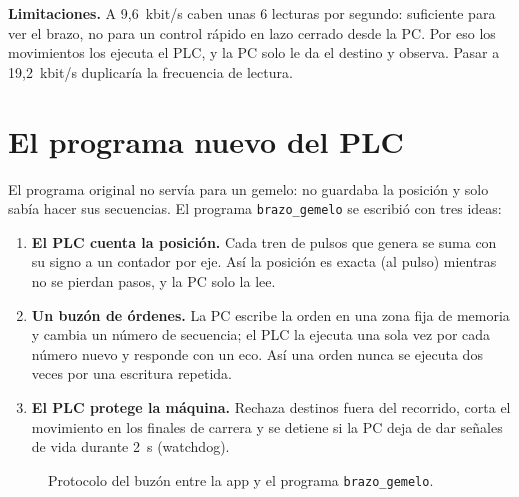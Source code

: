 \documentclass[a4paper,11pt]{article}
\newcommand{\codigo}[1]{\texttt{#1}}
\newcommand{\limite}[1]{\par\smallskip\noindent\colorbox{rojo!8}{\parbox{\dimexpr\linewidth-2\fboxsep}{\textbf{\color{rojo}Limitaciones.} #1}}\par\smallskip}
\begin{document}
\limite{A 9,6~kbit/s caben unas 6 lecturas por segundo: suficiente para ver el brazo, no para un control rápido en lazo cerrado desde la PC. Por eso los movimientos los ejecuta el PLC, y la PC solo le da el destino y observa. Pasar a 19,2~kbit/s duplicaría la frecuencia de lectura.}

\section{El programa nuevo del PLC}\label{sec:programa}

El programa original no servía para un gemelo: no guardaba la posición y solo sabía hacer sus secuencias. El programa \codigo{brazo\_gemelo} se escribió con tres ideas:

\begin{enumerate}
\item \textbf{El PLC cuenta la posición.} Cada tren de pulsos que genera se suma con su signo a un contador por eje. Así la posición es exacta (al pulso) mientras no se pierdan pasos, y la PC solo la lee.
\item \textbf{Un buzón de órdenes.} La PC escribe la orden en una zona fija de memoria y cambia un número de secuencia; el PLC la ejecuta una sola vez por cada número nuevo y responde con un eco. Así una orden nunca se ejecuta dos veces por una escritura repetida.
\item \textbf{El PLC protege la máquina.} Rechaza destinos fuera del recorrido, corta el movimiento en los finales de carrera y se detiene si la PC deja de dar señales de vida durante 2~s (watchdog).
\end{enumerate}

\begin{figure}[H]
\centering
{}
\caption{Protocolo del buzón entre la app y el programa \codigo{brazo\_gemelo}.}
\end{figure}
\end{document}
